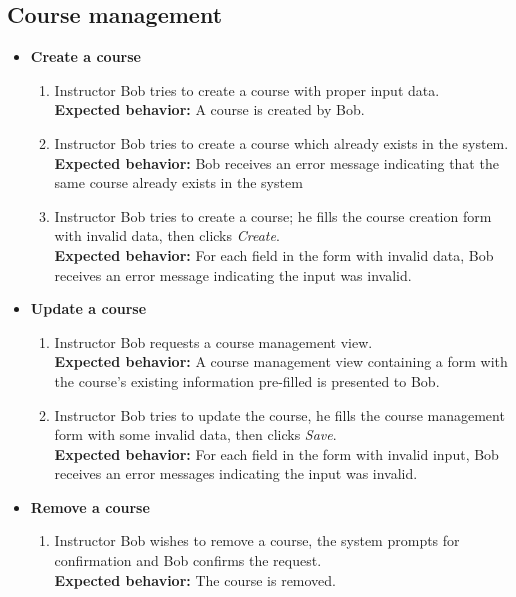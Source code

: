 \subsection{Course management}
\begin{itemize}
    \item \textbf{Create a course} \begin{enumerate}
        \item Instructor Bob tries to create a course with proper input data. \\
        {\bf Expected behavior:} A course is created by Bob.

        \item Instructor Bob tries to create a course which 
            already exists in the system. \\
        {\bf Expected behavior:} Bob receives an error message indicating that
            the same course already exists in the system

        \item Instructor Bob tries to create a course; he fills the
            course creation form with invalid data, then clicks \emph{Create}. \\
        {\bf Expected behavior:} For each field in the form with invalid data,
            Bob receives an error message indicating the input was invalid.
    \end{enumerate}

    \item \textbf{Update a course} \begin{enumerate}
        \item Instructor Bob requests a course management view. \\
        {\bf Expected behavior:} A course management view containing a form
            with the course's existing information pre-filled is presented
            to Bob.

        \item Instructor Bob tries to update the course, he fills the course
            management form with some invalid data, then clicks \emph{Save}. \\
        {\bf Expected behavior:} For each field in the form with invalid input,
            Bob receives an error messages indicating the input was
            invalid.
    \end{enumerate}

    \item \textbf{Remove a course} \begin{enumerate}
        \item Instructor Bob wishes to remove a course, the system prompts
            for confirmation and Bob confirms the request. \\
        {\bf Expected behavior:} The course is removed.
    \end{enumerate}


\end{itemize}
